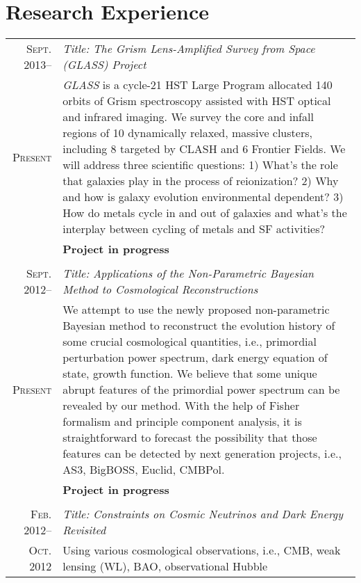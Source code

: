 \documentclass[10pt]{article}
\begin{document}
\section{Research Experience}
\vspace{-1ex}
\begin{longtable}{r|p{17cm}}
  \textsc{Sept. 2013}--  &   \emph{Title: The Grism Lens-Amplified Survey from Space (GLASS) Project}   \\
  \textsc{Present}       &   \small{\textit{GLASS} is a cycle-21 HST Large Program allocated 140 orbits of Grism spectroscopy
  assisted with HST optical and infrared imaging. We survey the core and infall regions of 10 dynamically relaxed, massive
  clusters, including 8 targeted by CLASH and 6 Frontier Fields. We will address three scientific questions: 1) What's the role that
  galaxies play in the process of reionization? 2) Why and how is galaxy evolution environmental dependent? 3) How do metals cycle
  in and out of galaxies and what's the interplay between cycling of metals and SF activities?}   \\
  &   \textbf{Project in progress} \\
  \multicolumn{2}{c}{} \\
  \textsc{Sept. 2012}--  &   \emph{Title: Applications of the Non-Parametric Bayesian Method to Cosmological Reconstructions}	\\
  \textsc{Present}       &   \small{We attempt to use the newly proposed non-parametric Bayesian method to reconstruct the
  evolution history of some crucial cosmological quantities, i.e., primordial perturbation power spectrum, dark energy equation of
  state, growth function. We believe that some unique abrupt features of the primordial power spectrum can be revealed by our
  method. With the help of Fisher formalism and principle component analysis, it is straightforward to forecast the possibility
  that those features can be detected by next generation projects, i.e., AS3, BigBOSS, Euclid, CMBPol.}	\\
  &   \textbf{Project in progress} \\
  \multicolumn{2}{c}{} \\
  \textsc{Feb. 2012}--  &   \emph{Title: Constraints on Cosmic Neutrinos and Dark Energy Revisited}  \\
  \textsc{Oct. 2012}    &   \small{Using various cosmological observations, i.e., CMB, weak lensing (WL), BAO, observational Hubble
}
\end{longtable}
\end{document}
